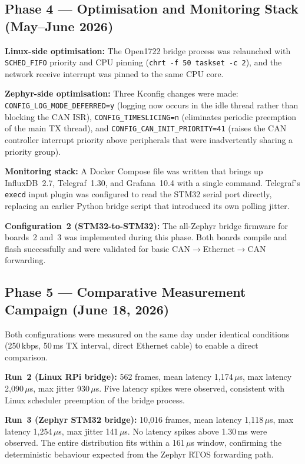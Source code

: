 \documentclass[11pt,a4paper]{article}
\begin{document}
\subsection{Phase 4 --- Optimisation and Monitoring Stack (May--June 2026)}

\textbf{Linux-side optimisation:}  The Open1722 bridge process was relaunched with
\texttt{SCHED\_FIFO} priority and CPU pinning (\texttt{chrt -f 50 taskset -c 2}),
and the network receive interrupt was pinned to the same CPU core.

\textbf{Zephyr-side optimisation:}  Three Kconfig changes were made:
\texttt{CONFIG\_LOG\_MODE\_DEFERRED=y} (logging now occurs in the idle thread rather
than blocking the CAN ISR), \texttt{CONFIG\_TIMESLICING=n} (eliminates periodic
preemption of the main TX thread), and \texttt{CONFIG\_CAN\_INIT\_PRIORITY=41}
(raises the CAN controller interrupt priority above peripherals that were inadvertently
sharing a priority group).

\textbf{Monitoring stack:}  A Docker Compose file was written that brings up
InfluxDB~2.7, Telegraf~1.30, and Grafana~10.4 with a single command.  Telegraf's
\texttt{execd} input plugin was configured to read the STM32 serial port directly,
replacing an earlier Python bridge script that introduced its own polling jitter.

\textbf{Configuration~2 (STM32-to-STM32):}  The all-Zephyr bridge firmware for boards~2
and~3 was implemented during this phase.  Both boards compile and flash successfully and
were validated for basic CAN$\rightarrow$Ethernet$\rightarrow$CAN forwarding.

\subsection{Phase 5 --- Comparative Measurement Campaign (June 18, 2026)}

Both configurations were measured on the same day under identical conditions
(250\,kbps, 50\,ms TX interval, direct Ethernet cable) to enable a direct comparison.

\textbf{Run~2 (Linux RPi bridge):} 562 frames, mean latency 1{,}174\,$\mu$s, max
latency 2{,}090\,$\mu$s, max jitter 930\,$\mu$s.  Five latency spikes were observed,
consistent with Linux scheduler preemption of the bridge process.

\textbf{Run~3 (Zephyr STM32 bridge):} 10{,}016 frames, mean latency 1{,}118\,$\mu$s,
max latency 1{,}254\,$\mu$s, max jitter 141\,$\mu$s.  No latency spikes above 1.30\,ms
were observed.  The entire distribution fits within a 161\,$\mu$s window, confirming the
deterministic behaviour expected from the Zephyr RTOS forwarding path.
\end{document}
